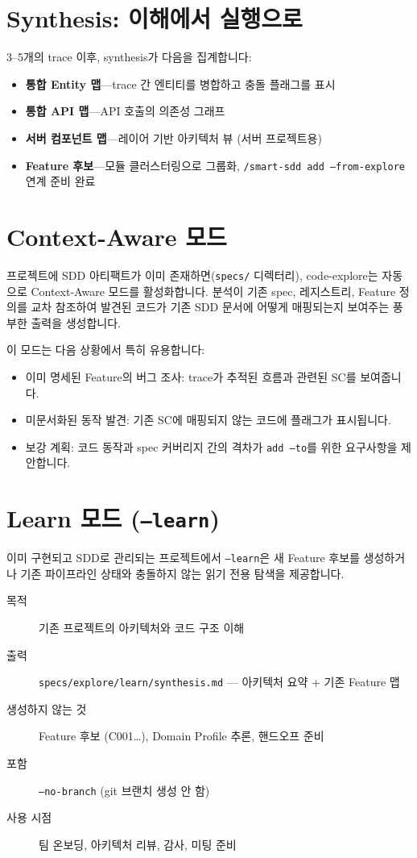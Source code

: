 \documentclass[11pt,a4paper,openright,twoside]{report}
\newcommand{\file}[1]{\texttt{#1}}
\begin{document}
\section{Synthesis: 이해에서 실행으로}

3--5개의 trace 이후, synthesis가 다음을 집계합니다:

\begin{itemize}
  \item \textbf{통합 Entity 맵}---trace 간 엔티티를 병합하고 충돌 플래그를 표시
  \item \textbf{통합 API 맵}---API 호출의 의존성 그래프
  \item \textbf{서버 컴포넌트 맵}---레이어 기반 아키텍처 뷰 (서버 프로젝트용)
  \item \textbf{Feature 후보}---모듈 클러스터링으로 그룹화, \texttt{/smart-sdd add --from-explore} 연계 준비 완료
\end{itemize}

\section{Context-Aware 모드}

프로젝트에 SDD 아티팩트가 이미 존재하면(\file{specs/} 디렉터리), code-explore는 자동으로 Context-Aware 모드를 활성화합니다. 분석이 기존 spec, 레지스트리, Feature 정의를 교차 참조하여 발견된 코드가 기존 SDD 문서에 어떻게 매핑되는지 보여주는 풍부한 출력을 생성합니다.

이 모드는 다음 상황에서 특히 유용합니다:
\begin{itemize}
  \item 이미 명세된 Feature의 버그 조사: trace가 추적된 흐름과 관련된 SC를 보여줍니다.
  \item 미문서화된 동작 발견: 기존 SC에 매핑되지 않는 코드에 플래그가 표시됩니다.
  \item 보강 계획: 코드 동작과 spec 커버리지 간의 격차가 \texttt{add --to}를 위한 요구사항을 제안합니다.
\end{itemize}

\section{Learn 모드 (\texttt{--learn})}

이미 구현되고 SDD로 관리되는 프로젝트에서 \texttt{--learn}은 새 Feature 후보를 생성하거나 기존 파이프라인 상태와 충돌하지 않는 읽기 전용 탐색을 제공합니다.

\begin{description}
  \item[목적] 기존 프로젝트의 아키텍처와 코드 구조 이해
  \item[출력] \file{specs/explore/learn/synthesis.md} --- 아키텍처 요약 + 기존 Feature 맵
  \item[생성하지 않는 것] Feature 후보 (C001\ldots), Domain Profile 추론, 핸드오프 준비
  \item[포함] \texttt{--no-branch} (git 브랜치 생성 안 함)
  \item[사용 시점] 팀 온보딩, 아키텍처 리뷰, 감사, 미팅 준비
\end{description}
\end{document}
